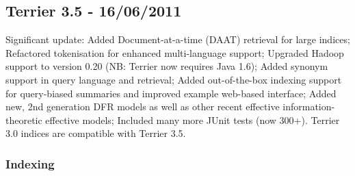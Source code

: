 \subsection{Terrier 3.5 - 16/06/2011}\label{terrier-3.5---16062011}

Significant update: Added Document-at-a-time (DAAT) retrieval for large
indices; Refactored tokenisation for enhanced multi-language support;
Upgraded Hadoop support to version 0.20 (NB: Terrier now requires Java
1.6); Added synonym support in query language and retrieval; Added
out-of-the-box indexing support for query-biased summaries and improved
example web-based interface; Added new, 2nd generation DFR models as
well as other recent effective information-theoretic effective models;
Included many more JUnit tests (now 300+). Terrier 3.0 indices are
compatible with Terrier 3.5.

\subsubsection{Indexing}\label{indexing-3}

